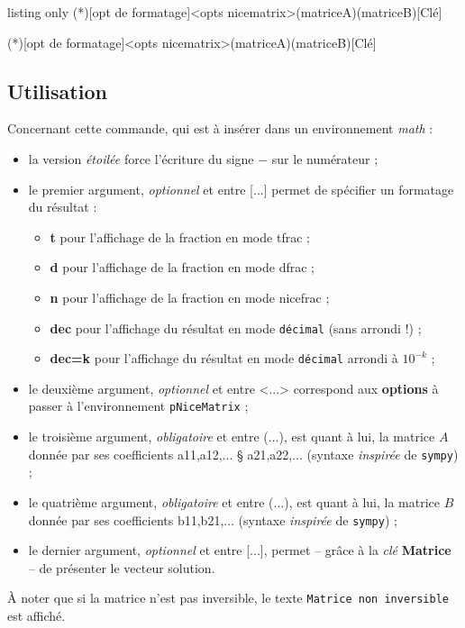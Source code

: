 \documentclass[french,a4paper,11pt]{article}
\newcommand\Cle[1]{{\bfseries\sffamily\textlangle #1\textrangle}}
\newcommand\cmaj[1]{\tcbox[vignetteMaJ]{#1}\xspace}
\begin{document}
\begin{PresentationCode}{listing only}
\SolutionSysteme(*)[opt de formatage]<opts nicematrix>(matriceA)(matriceB)[Clé]

\SolutionSystemePY(*)[opt de formatage]<opts nicematrix>(matriceA)(matriceB)[Clé]
\end{PresentationCode}

\subsection{Utilisation}

\begin{tipblock}
Concernant cette commande, qui est à insérer dans un environnement \textit{math} :

\begin{itemize}
	\item \cmaj{0.1.3} la version \textit{étoilée} force l'écriture du signe \og $-$ \fg{} sur le numérateur ;
	\item le premier argument, \textit{optionnel} et entre \textsf{[...]} permet de spécifier un formatage du résultat :
	\begin{itemize}
		\item \Cle{t} pour l'affichage de la fraction en mode \textsf{tfrac} ;
		\item \Cle{d} pour l'affichage de la fraction en mode \textsf{dfrac} ;
		\item \Cle{n} pour l'affichage de la fraction en mode \textsf{nicefrac} ;
		\item \Cle{dec} pour l'affichage du résultat en mode \texttt{décimal} (sans arrondi !) ;
		\item \Cle{dec=k} pour l'affichage du résultat en mode \texttt{décimal} arrondi à $10^{-k}$ ;
	\end{itemize}
	\item le deuxième argument, \textit{optionnel} et entre \textsf{<...>} correspond aux \Cle{options} à passer à l'environnement \texttt{pNiceMatrix} ;
	\item le troisième argument, \textit{obligatoire} et entre \textsf{(...)}, est quant à lui, la matrice $A$ donnée par ses coefficients \textsf{a11,a12,... § a21,a22,...} (syntaxe \textit{inspirée} de \texttt{sympy}) ;
	\item le quatrième argument, \textit{obligatoire} et entre \textsf{(...)}, est quant à lui, la matrice $B$ donnée par ses coefficients \textsf{b11,b21,...} (syntaxe \textit{inspirée} de \texttt{sympy}) ;
	\item le dernier argument, \textit{optionnel} et entre \textsf{[...]}, permet -- grâce à la \textit{clé} \Cle{Matrice} -- de présenter le vecteur solution.
\end{itemize}
À noter que si la matrice n'est pas inversible, le texte \texttt{Matrice non inversible} est affiché.
\end{tipblock}
\end{document}
